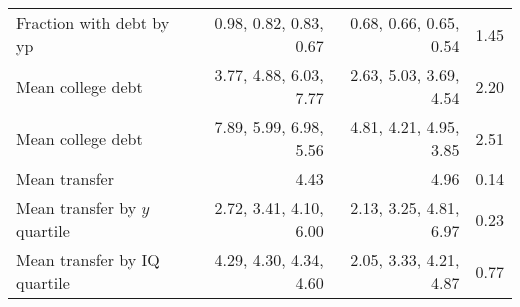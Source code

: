 \begin{tabular}{lrrr}
Fraction with debt by yp & 0.98, 0.82, 0.83, 0.67  & 0.68, 0.66, 0.65, 0.54  & 1.45  \\ 
Mean college debt & 3.77, 4.88, 6.03, 7.77  & 2.63, 5.03, 3.69, 4.54  & 2.20  \\ 
Mean college debt & 7.89, 5.99, 6.98, 5.56  & 4.81, 4.21, 4.95, 3.85  & 2.51  \\ 
Mean transfer & 4.43  & 4.96  & 0.14  \\ 
Mean transfer by $y$ quartile & 2.72, 3.41, 4.10, 6.00  & 2.13, 3.25, 4.81, 6.97  & 0.23  \\ 
Mean transfer by IQ quartile & 4.29, 4.30, 4.34, 4.60  & 2.05, 3.33, 4.21, 4.87  & 0.77  \\ 
\hline
\end{tabular}%
